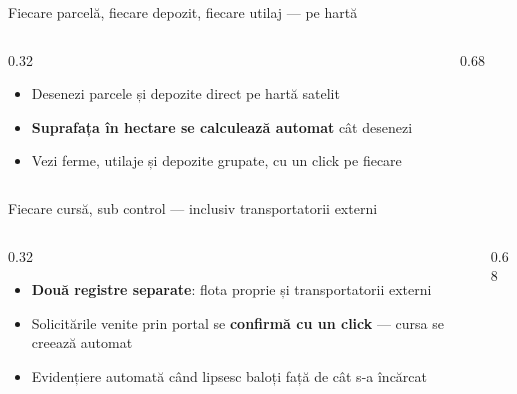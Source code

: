\documentclass[aspectratio=169,10pt]{beamer}
\begin{document}
\begin{frame}{Fiecare parcelă, fiecare depozit, fiecare utilaj — pe hartă}
  \begin{columns}[T]
    \begin{column}{0.32\linewidth}
      \vspace{0.3cm}
      \begin{itemize}
        \item Desenezi parcele și depozite direct pe hartă satelit
        \item \textbf{Suprafața în hectare se calculează automat} cât desenezi
        \item Vezi ferme, utilaje și depozite grupate, cu un click pe fiecare
      \end{itemize}
    \end{column}
    \begin{column}{0.68\linewidth}
    \end{column}
  \end{columns}
\end{frame}

\begin{frame}{Fiecare cursă, sub control — inclusiv transportatorii externi}
  \begin{columns}[T]
    \begin{column}{0.32\linewidth}
      \vspace{0.3cm}
      \begin{itemize}
        \item \textbf{Două registre separate}: flota proprie și transportatorii externi
        \item Solicitările venite prin portal se \textbf{confirmă cu un click} — cursa se creează automat
        \item Evidențiere automată când lipsesc baloți față de cât s-a încărcat
      \end{itemize}
    \end{column}
    \begin{column}{0.68\linewidth}
    \end{column}
  \end{columns}
\end{frame}
\end{document}
